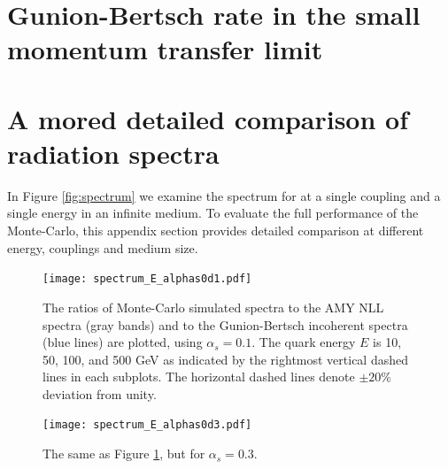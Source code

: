 \documentclass[aps, prc, reprint, amsmath, groupedaddress, nofootinbib]{revtex4-1}
\begin{document}
\begin{appendices}
\section{Gunion-Bertsch rate in the small momentum transfer limit}\label{app:consistency}
\section{A mored detailed comparison of radiation spectra}\label{app:tune-spectrum}
In Figure \ref{fig:spectrum} we examine the spectrum for at a single coupling and a single energy in an infinite medium. To evaluate the full performance of the Monte-Carlo, this appendix section provides detailed comparison at different energy, couplings and medium size.
\begin{figure}
\texttt{[image: spectrum\_E\_alphas0d1.pdf]}
\caption{The ratios of Monte-Carlo simulated spectra to the AMY NLL spectra (gray bands) and to the Gunion-Bertsch incoherent spectra (blue lines) are plotted, using $\alpha_s = 0.1$. The quark energy $E$ is 10, 50, 100, and 500 GeV as indicated by the rightmost vertical dashed lines in each subplots. The horizontal dashed lines denote $\pm 20\%$ deviation from unity.}
\label{fig:spectra-alphas=0.1}
\end{figure}

\begin{figure}
\texttt{[image: spectrum\_E\_alphas0d3.pdf]}
\caption{The same as Figure \ref{fig:spectra-alphas=0.1}, but for $\alpha_s = 0.3$.}
\label{fig:spectra-alphas=0.3}
\end{figure}

\label{app:tune}
\end{appendices}
 
\end{document}
